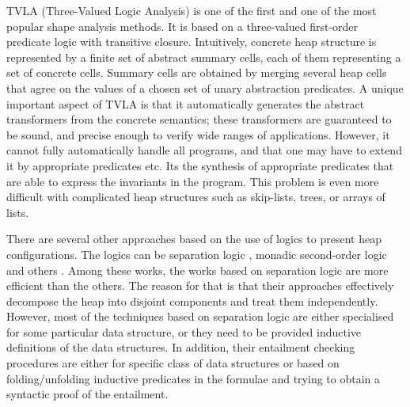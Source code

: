 TVLA (Three-Valued Logic Analysis) \cite{SagivRW02} is one of the first and one of the most popular shape analysis
methods. It is based on a three-valued first-order predicate logic with transitive closure. Intuitively, concrete heap structure is represented by a finite set of abstract summary cells, each of them representing a set of concrete cells. Summary cells are obtained by merging several heap cells that agree on the values of a chosen set of unary abstraction predicates.  %
A unique important aspect of TVLA is that it automatically generates the abstract transformers from the concrete semantics; these transformers are guaranteed to be sound, and precise enough to verify wide ranges of applications. However, it cannot fully automatically handle all programs, and that one may have to extend it by appropriate predicates etc. Its the synthesis of appropriate predicates that are able to express the invariants in the program. This problem is even more difficult with complicated heap structures such as skip-lists, trees, or arrays of lists.  

There are several other approaches
 based on the use of logics to present heap configurations. The logics can be separation logic \cite{John:SL, Stephen:SL,JoshCris:SL,Hongseok:SL,Kamil:SL,Chin:SL,Quang:SL, Ruzica:SL, Constrantin:SL}, monadic second-order
 logic \cite{Ander:ML, Jakob:ML,Madhusudan:ML} and others \cite{Shmuel:Shape, Karen:Shape}. Among these works, the works based on separation logic are
  more efficient than the others. 
  The reason for that is that their approaches effectively decompose the heap into disjoint components and treat them independently. However, most of the techniques based on separation logic are either specialised for some particular data structure, or they need to be provided inductive definitions of the data structures. In addition, their entailment checking procedures are either for specific class of data structures or based on folding/unfolding inductive predicates in the formulae and trying to obtain a syntactic proof of the entailment. 

